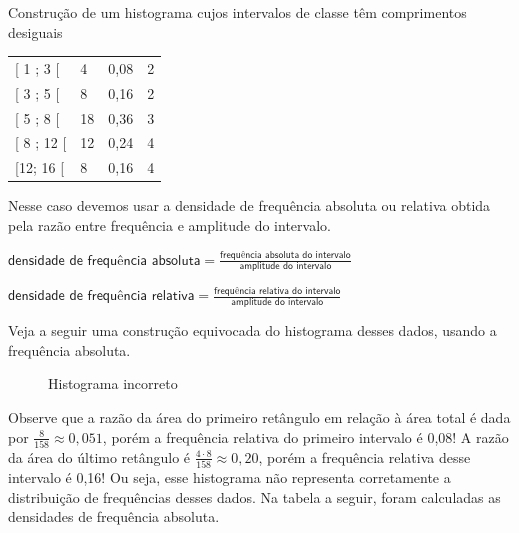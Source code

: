 \begin{example}{Construção de um histograma cujos intervalos de classe têm comprimentos desiguais}
\begin{savenotes}\sphinxattablestart
\centering
\begin{tabulary}{\linewidth}[t]{|T|T|T|T|}
\hline
{}\relax &\relax &\relax &\relax \\
\hline
{[} 1 ; 3 {[}
&
4
&
0,08
&
2
\\
\hline
{[} 3 ; 5 {[}
&
8
&
0,16
&
2
\\
\hline
{[} 5 ; 8 {[}
&
18
&
0,36
&
3
\\
\hline
{[} 8 ; 12 {[}
&
12
&
0,24
&
4
\\
\hline
{[}12; 16 {[}
&
8
&
0,16
&
4
\\
\hline
\end{tabulary}
\par
\sphinxattableend\end{savenotes}

Nesse caso devemos usar a densidade de frequência absoluta ou relativa obtida pela razão entre frequência e amplitude do intervalo.

\(\textsf{densidade de frequência absoluta}=\frac{\textsf{frequência absoluta do intervalo}}{\textsf{amplitude do intervalo}}\)

\(\textsf{densidade de frequência relativa}=\frac{\textsf{frequência relativa do intervalo}}{\textsf{amplitude do intervalo}}\)

Veja a seguir uma construção equivocada do histograma desses dados, usando a frequência absoluta.

\begin{figure}[H]
\centering
\capstart

\noindent{}
\caption{Histograma incorreto}\label{\detokenize{PE103-4:fig-coloque-aqui-o-nome}}\label{\detokenize{PE103-4:id8}}\end{figure}

Observe que a razão da área do primeiro retângulo em relação à área total é dada por \(\displaystyle{\frac{8}{158}}\approx  0,051\), porém a frequência relativa do primeiro intervalo é 0,08! A razão da área do último retângulo é \(\displaystyle{\frac{4\cdot 8}{158}}\approx 0,20\), porém a frequência relativa desse intervalo é 0,16! Ou seja, esse histograma não representa corretamente a distribuição de frequências desses dados. Na tabela a seguir, foram calculadas as densidades de frequência absoluta.



\end{example}
